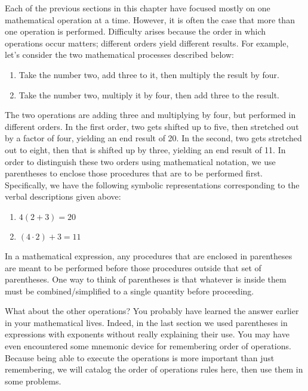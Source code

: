 Each of the previous sections in this chapter have focused mostly on one mathematical operation at a time. However, it is often the case that more than one operation is performed. Difficulty arises because the order in which operations occur matters; different orders yield different results. For example, let's consider the two mathematical processes described below:
\begin{enumerate}
\item Take the number two, add three to it, then multiply the result by four.
\item Take the number two, multiply it by four, then add three to the result.
\end{enumerate}
The two operations are adding three and multiplying by four, but performed in different orders. In the first order, two gets shifted up to five, then stretched out by a factor of four, yielding an end result of 20. In the second, two gets stretched out to eight, then that is shifted up by three, yielding an end result of 11. In order to distinguish these two orders using mathematical notation, we use parentheses to enclose those procedures that are to be performed first. Specifically, we have the following symbolic representations corresponding to the verbal descriptions given above:
\begin{enumerate}
\item $4(2+3) = 20$
\item $(4\cdot 2)+3 = 11$
\end{enumerate}
In a mathematical expression, any procedures that are enclosed in parentheses are meant to be performed before those procedures outside that set of parentheses. One way to think of parentheses is that whatever is inside them must be combined/simplified to a single quantity before proceeding. 
\par
What about the other operations? You probably have learned the answer earlier in your mathematical lives. Indeed, in the last section we used parentheses in expressions with exponents without really explaining their use. You may have even encountered some mnemonic device for remembering order of operations. Because being able to execute the operations is more important than just remembering, we will catalog the order of operations rules here, then use them in some problems.

\vfill
\pagebreak

